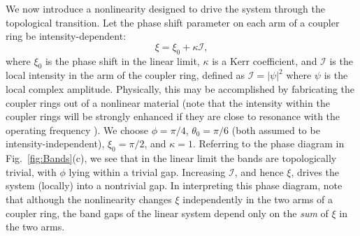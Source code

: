 \documentclass[aps,prx,twocolumn,superscriptaddress]{revtex4-1}
\begin{document}
We now introduce a nonlinearity designed to drive the system through the topological transition.  Let the phase shift parameter on each arm of a coupler ring be intensity-dependent:
\begin{equation}
  \xi = \xi_0 + \kappa \mathcal{I},
  \label{eq:kerr_coupler}
\end{equation}
where $\xi_0$ is the phase shift in the linear limit, $\kappa$ is a Kerr coefficient, and $\mathcal{I}$ is the local intensity in the arm of the coupler ring, defined as $\mathcal{I} = |\psi|^2$ where $\psi$ is the local complex amplitude.  Physically, this may be accomplished by fabricating the coupler rings out of a nonlinear material (note that the intensity within the coupler rings will be strongly enhanced if they are close to resonance with the operating frequency \cite{liang2014}).  We choose $\phi = \pi/4$, $\theta_0 = \pi/6$ (both assumed to be intensity-independent), $\xi_0 = \pi/2$, and $\kappa = 1$.  Referring to the phase diagram in Fig.~\ref{fig:Bands}(c), we see that in the linear limit the bands are topologically trivial, with $\phi$ lying within a trivial gap.  Increasing $\mathcal{I}$, and hence $\xi$, drives the system (locally) into a nontrivial gap.  In interpreting this phase diagram, note that although the nonlinearity changes $\xi$ independently in the two arms of a coupler ring, the band gaps of the linear system depend only on the \textit{sum} of $\xi$ in the two arms.
\end{document}
